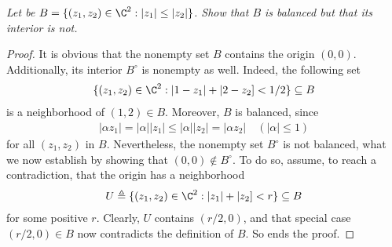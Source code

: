 \textit{Let be %
%
  $B = \{(z_{1}, z_{2}) \in \C^2: |z_{1}| \leq |z_{2}| \}$. %
%
Show that $B$ is balanced but that its interior is not.
}
%
\begin{proof}
It is obvious that the nonempty set $B$ contains the origin $(0,0)$. %
Additionally, its interior $B^\circ$ is nonempty as well. %
Indeed, the following set %
%
\begin{align}
  \{(z_1, z_2) \in \C^2: |1- z_1| + |2- z_2] < 1/2 \} \subseteq B %
\end{align}
%
is a neighborhood of $(1, 2) \in B$. %
Moreover, $B$ is balanced, since
\begin{align}
  |\alpha z_1|  = |\alpha| |z_1| \leq  |\alpha| |z_2| = |\alpha z_2| %
  \quad (|\alpha| \leq 1)
\end{align}
%
for all $(z_1, z_2)$ in $B$. %
%
Nevertheless, the nonempty set $B^\circ$ is not balanced, what we now %
establish by showing that $(0, 0) \notin B^\circ$. %
%
To do so, assume, to reach a contradiction, %
that the origin has a neighborhood %
%
\begin{align}
  U \triangleq \{(z_1, z_2) \in \C^2: |z_1| + |z_2] < r \} \subseteq B %
\end{align}
%
for some positive $r$. Clearly, $U$ contains $(r/2, 0)$,  %
and that special case $(r/2, 0) \in B$ now contradicts the definition of $B$. %
So ends the proof.
\end{proof}
